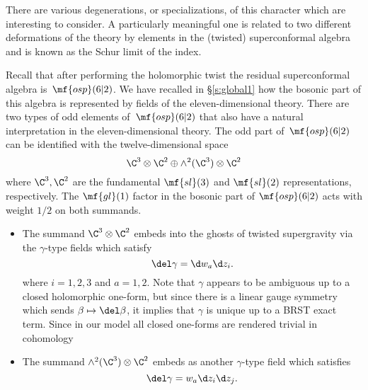 
%
%

\parsec
There are various degenerations, or specializations, of this character which are interesting to consider.
A particularly meaningful one is related to two different deformations of the theory by elements in the (twisted) superconformal algebra and is known as the Schur limit of the index.

Recall that after performing the holomorphic twist the residual superconformal algebra is~$\mf{osp}(6|2)$.
We have recalled in \S\ref{s:global1} how the bosonic part of this algebra is represented by fields of the eleven-dimensional theory. 
There are two types of odd elements of~$\mf{osp}(6|2)$ that also have a natural interpretation in the eleven-dimensional theory.
The odd part of~$\mf{osp}(6|2)$ can be identified with the twelve-dimensional space
\[
\C^3 \otimes \C^2 \oplus \wedge^2(\C^3) \otimes \C^2 
\]
where $\C^3, \C^2$ are the fundamental $\mf{sl}(3)$ and $\mf{sl}(2)$ representations, respectively. 
The $\mf{gl}(1)$ factor in the bosonic part of $\mf{osp}(6|2)$ acts with weight $1/2$ on both summands. 

\begin{itemize}
\item The summand $\C^3 \otimes \C^2$ embeds into the ghosts of twisted supergravity via the $\gamma$-type fields which satisfy
\[
\del \gamma = \d w_a \d z_i .
\]
where $i=1,2,3$ and $a = 1,2$.
Note that $\gamma$ appears to be ambiguous up to a closed holomorphic one-form, but since there is a linear gauge symmetry which sends $\beta \mapsto \del \beta$, it implies that $\gamma$ is unique up to a BRST exact term. 
Since in our model all closed one-forms are rendered trivial in cohomology
\item The summand $\wedge^2(\C^3) \otimes \C^2$ embeds as another $\gamma$-type field which satisfies 
\[
\del \gamma = w_a \d z_i \d z_j .
\]
\end{itemize}

